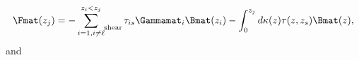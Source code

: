 \begin{equation}
\Fmat(z_j) = - \sum\limits_{i = 1, i \neq \ell}^{z_i < z_j}\mathop{}_{\mkern-5mu \rm{shear}} \tau_{is} \Gammamat_i \Bmat(z_i) \\
- \int_0^{z_j} d\kappa(z) \tau(z, z_s) \Bmat(z),
\end{equation}
and